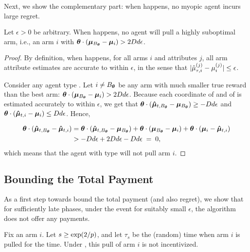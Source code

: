 Next, we show the complementary part:
when  happens, no myopic agent incurs large regret.

\begin{lemma} \label{lem:right-choice}
Let $\epsilon > 0$ be arbitrary.
When  happens,
no agent \AgV will pull a highly suboptimal arm, i.e., an arm $i$ with 
$\bm{\theta} \cdot (\bm{\mu}_{B_{\bm{\theta}}} - \bm{\mu}_{i}) > 2D d \epsilon$.
\end{lemma}

\begin{proof}
By definition, when  happens,
for all arms $i$ and attributes $j$,
all arm attribute estimates are accurate to within $\epsilon$,
in the sense that
$|\hat{\mu}_{\tau,i}^{(j)} - \mu_{i}^{(j)}| \leq \epsilon$.

Consider any agent type \AgV.
Let $i \neq B_{\bm{\theta}}$ be any arm
with much smaller true reward than the best arm:
$\bm{\theta} \cdot (\bm{\mu}_{B_{\bm{\theta}}} - \bm{\mu}_{i}) > 2D d \epsilon$.
Because each coordinate of  and of
 is estimated accurately to within $\epsilon$, 
we get that 
$\bm{\theta} \cdot (\bm{\hat{\mu}}_{t,B_{\bm{\theta}}} - \bm{\mu}_{B_{\bm{\theta}}})
\geq - D d \epsilon$
and
$\bm{\theta} \cdot (\bm{\hat{\mu}}_{t,i} - \bm{\mu}_{i}) \leq D d \epsilon$.
Hence, 

\begin{align}
\bm{\theta} \cdot (\bm{\hat{\mu}}_{t,B_{\bm{\theta}}} - \bm{\hat{\mu}}_{t,i})
& =
\bm{\theta} \cdot (\bm{\hat{\mu}}_{t,B_{\bm{\theta}}} - \bm{\mu}_{B_{\bm{\theta}}})
+ \bm{\theta} \cdot (\bm{\mu}_{B_{\bm{\theta}}} - \bm{\mu}_{i})
+ \bm{\theta} \cdot (\bm{\mu}_{i} - \bm{\hat{\mu}}_{t,i}) \nonumber\\
& > -D d \epsilon + 2 D d \epsilon - D d \epsilon
\; = \; 0, \label{equ:choice}
\end{align}
which means that the agent with type \AgV will not pull arm $i$.
\end{proof}

\subsection{Bounding the Total Payment}

As a first step towards bound the total payment (and also regret),
we show that for sufficiently late phases,
under the event  for suitably small $\epsilon$,
the algorithm does not offer any payments.

\begin{lemma} \label{lem:no-incentives}
Fix an arm $i$.
Let $s \geq \exp(2/p)$, and let $\tau_s$ be the (random)
time when arm $i$ is pulled for the  time.
Under ,
this pull of arm $i$ is not incentivized.
\end{lemma}

